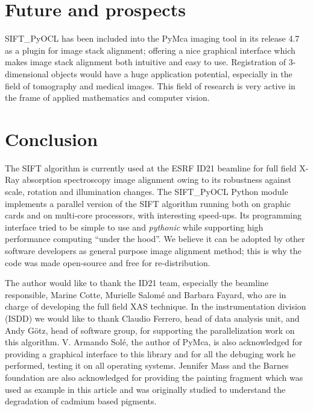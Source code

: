 \documentclass[preprint]{iucr}
\begin{document}
\section{Future and prospects}

SIFT\_PyOCL has been included into the PyMca imaging tool \cite{pymca} in its
release 4.7 as a plugin for image stack alignment; offering a nice graphical
interface which makes image stack alignment both intuitive and easy to use.
Registration of 3-dimensional objects would have a huge application potential,
especially in the field of tomography and medical images.
This field of research is very active in the frame of applied mathematics and
computer vision.


\section{Conclusion}

The SIFT algorithm is currently used at the ESRF ID21 beamline for full field
X-Ray absorption spectroscopy image alignment owing to its robustness against
scale, rotation and illumination changes.
The SIFT\_PyOCL Python module implements a parallel version of the SIFT
algorithm running both on graphic cards and on multi-core processors, with
interesting speed-ups.
Its programming interface tried to be simple to use and \emph{pythonic} while
supporting high performance computing ``under the hood''.
We believe it can be adopted by other software developers as general purpose
image alignment method; this is why the code was made open-source and free for
re-distribution.



The author would like to thank the ID21 team, especially the beamline
responsible, Marine Cotte, Murielle Salomé and Barbara Fayard, who are in charge
of developing the full field XAS technique.
In the instrumentation division (ISDD) we would like to thank Claudio Ferrero,
head of data analysis unit, and Andy G\"otz, head of software group, for
supporting the parallelization work on this algorithm.
V. Armando Solé, the
author of PyMca, is also acknowledged for providing a graphical interface to
this library and for all the debuging work he performed, testing it on all
operating systems.
Jennifer Mass and the Barnes foundation are also acknowledged for providing
the painting fragment which was used as example in this article and was originally studied to
understand the degradation of cadmium based pigments.


\end{document}
